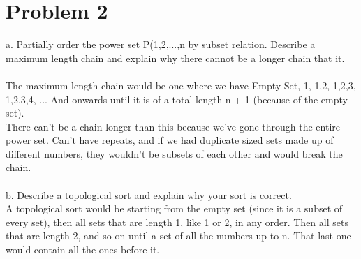 \documentclass{article}
\begin{document}
\section{Problem 2}
a. Partially order the power set P({1,2,...,n} by subset relation. Describe a maximum length chain and explain why there cannot be a longer chain that it. 
\\\\
The maximum length chain would be one where we have Empty Set, {1}, {1,2}, {1,2,3}, {1,2,3,4}, ... And onwards until it is of a total length n + 1 (because of the empty set). \\
There can't be a chain longer than this because we've gone through the entire power set. Can't have repeats, and if we had duplicate sized sets made up of different numbers, they wouldn't be subsets of each other and would break the chain. 
\\\\
b. Describe a topological sort and explain why your sort is correct.
\\
A topological sort would be starting from the empty set (since it is a subset of every set), then all sets that are length 1, like {1} or {2}, in any order. Then all sets that are length 2, and so on until a set of all the numbers up to n. That last one would contain all the ones before it. 
\end{document}
